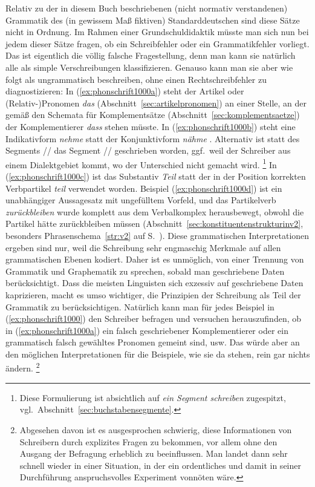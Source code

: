 Relativ zu der in diesem Buch beschriebenen (nicht normativ verstandenen) Grammatik des (in gewissem Maß fiktiven) Standarddeutschen sind diese Sätze nicht in Ordnung.
Im Rahmen einer Grundschuldidaktik müsste man sich nun bei jedem dieser Sätze fragen, ob ein Schreibfehler oder ein Grammatikfehler vorliegt.
Das ist eigentlich die völlig falsche Fragestellung, denn man kann sie natürlich alle als simple Verschreibungen klassifizieren.
Genauso kann man sie aber wie folgt als ungrammatisch beschreiben, ohne einen Rechtschreibfehler zu diagnostizieren:
In (\ref{ex:phonschrift1000a}) steht der Artikel oder (Relativ-)Pronomen \textit{das} (Abschnitt~\ref{sec:artikelpronomen}) an einer Stelle, an der gemäß den Schemata für Komplementsätze (Abschnitt~\ref{sec:komplementsaetze}) der Komplementierer \textit{dass} stehen müsste.
In (\ref{ex:phonschrift1000b}) steht eine Indikativform \textit{nehme} \textipa{[ne:me]} statt der Konjunktivform \textit{nähme} \textipa{[nE:me]}.
Alternativ ist statt des Segments // das Segment // geschrieben worden, ggf.\ weil der Schreiber aus einem Dialektgebiet kommt, wo der Unterschied nicht gemacht wird.%
\footnote{Diese Formulierung ist absichtlich auf \textit{ein Segment schreiben} zugespitzt, vgl.\ Abschnitt~\ref{sec:buchstabensegmente}.}
In (\ref{ex:phonschrift1000c}) ist das Substantiv \textit{Teil} statt der in der Position korrekten Verbpartikel \textit{teil} verwendet worden.
Beispiel (\ref{ex:phonschrift1000d}) ist ein unabhängiger Aussagesatz mit ungefülltem Vorfeld, und das Partikelverb \textit{zurückbleiben} wurde komplett aus dem Verbalkomplex herausbewegt, obwohl die Partikel hätte zurückbleiben müssen (Abschnitt~\ref{sec:konstituentenstrukturinv2}, besonders Phrasenschema~\ref{str:v2} auf S.~\pageref{str:v2}).
Diese grammatischen Interpretationen ergeben sind nur, weil die Schreibung sehr engmaschig Merkmale auf allen grammatischen Ebenen kodiert.
Daher ist es unmöglich, von einer Trennung von Grammatik und Graphematik zu sprechen, sobald man geschriebene Daten berücksichtigt.
Dass die meisten Linguisten sich exzessiv auf geschriebene Daten kaprizieren, macht es umso wichtiger, die Prinzipien der Schreibung als Teil der Grammatik zu berücksichtigen.
Natürlich kann man für jedes Beispiel in (\ref{ex:phonschrift1000}) den Schreiber befragen und versuchen herauszufinden, ob in (\ref{ex:phonschrift1000a}) ein falsch geschriebener Komplementierer oder ein grammatisch falsch gewähltes Pronomen gemeint sind, usw.
Das würde aber an den möglichen Interpretationen für die Beispiele, wie sie da stehen, rein gar nichts ändern.%
\footnote{Abgesehen davon ist es ausgesprochen schwierig, diese Informationen von Schreibern durch explizites Fragen zu bekommen, vor allem ohne den Ausgang der Befragung erheblich zu beeinflussen.
Man landet dann sehr schnell wieder in einer Situation, in der ein ordentliches und damit in seiner Durchführung anspruchsvolles Experiment vonnöten wäre.}

